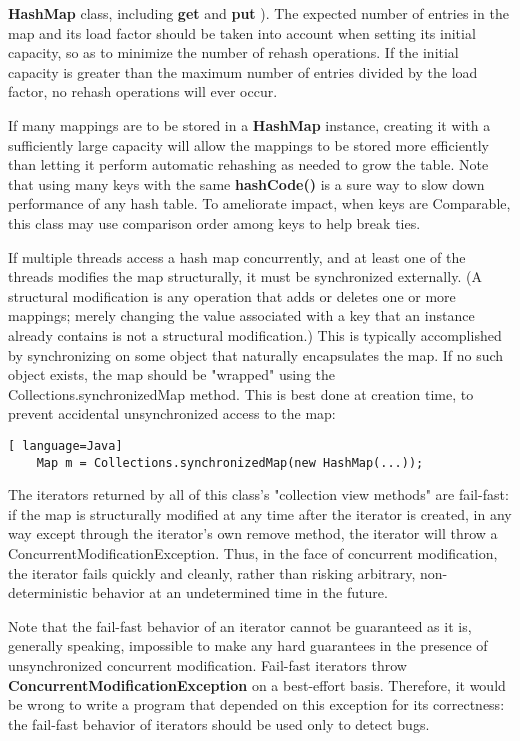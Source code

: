 \documentclass[UTF8,11pt]{ctexbook}
\newcommand{\bold}[1]{\textbf{#1}}
\newcommand{\point}[1]{\noindent{\textbf{#1}}}
\begin{document}
	\bold{HashMap} class, including \bold{get}  and \bold{put} ). The expected number of entries in the map and
	its load factor should be taken into account when setting its initial capacity, so as to minimize the number
	of rehash operations. If the initial capacity is greater than the maximum number of entries divided by the
	load factor, no rehash operations will ever occur.
	\par 
	If many mappings are to be stored in a \bold{HashMap} instance, creating it with a sufficiently large capacity
	will allow the mappings to be stored more efficiently than letting it perform automatic rehashing as needed
	to grow the table. Note that using many keys with the same  \bold{hashCode()}  is a sure way to slow down
	performance of any hash table. To ameliorate impact, when keys are Comparable, this class may use comparison
	order among keys to help break ties.
	\par
	\point{Note that this implementation is not synchronized.} If multiple threads access a hash map concurrently,
	 and at least one of the threads modifies the map structurally, it must be synchronized externally.
	(A structural modification is any operation that adds or deletes one or more mappings; merely changing the
	value associated with a key that an instance already contains is not a structural modification.) This is
	typically accomplished by synchronizing on some object that naturally encapsulates the map. If no such 
	object exists, the map should be "wrapped" using the Collections.synchronizedMap method. This is best 
	done at creation time, to prevent accidental unsynchronized access to the map:
	\par
	
	\begin{lstlisting}[ language=Java]
	Map m = Collections.synchronizedMap(new HashMap(...));
	\end{lstlisting}
	
	The iterators returned by all of this class's "collection view methods" are fail-fast: if the map is structurally
	 modified at any time after the iterator is created, in any way except through the iterator's own remove method,
	the iterator will throw a ConcurrentModificationException. Thus, in the face of concurrent modification, the 
	iterator fails quickly and cleanly, rather than risking arbitrary, non-deterministic behavior at an undetermined
	time in the future.
	\par
	
	Note that the fail-fast behavior of an iterator cannot be guaranteed as it is, generally speaking, impossible 
	to make any hard guarantees in the presence of unsynchronized concurrent modification. Fail-fast iterators
	 throw  \bold{ConcurrentModificationException} on a best-effort basis. Therefore, it would be wrong to 
	 write a program that depended on this exception for its correctness: the fail-fast behavior of iterators
	  should be used only to detect bugs.
	\par
	
\end{document}

